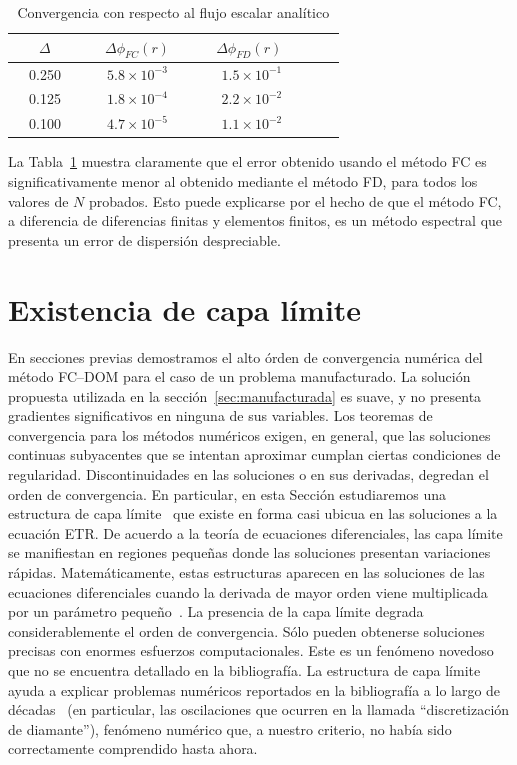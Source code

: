 \begin{table}[h!]
\caption{Convergencia con respecto al flujo escalar analítico} 
\vspace{-0.3cm}
\begin{center}
\begin{tabular}{ccccc}
\hline
  ~~$\Delta$~~  &  ~~$\Delta \phi_{FC}(r)$~~   &   ~~$\Delta \phi_{FD}(r)$ ~~ \\
\hline
 ~~0.250~~   &  ~~$5.8\times 10^{-3}$~~  &  ~~$1.5\times 10^{-1}$~~   \\
 ~~0.125~~   &  ~~$1.8\times 10^{-4}$~~  &  ~~$2.2\times 10^{-2}$~~   \\
 ~~0.100~~   &  ~~$4.7\times 10^{-5}$~~  &  ~~$1.1\times 10^{-2}$~~    \\
\hline
\end{tabular}
\label{tab:convFCanalytic}
\end{center}
\end{table}
La Tabla~\ref{tab:convFCanalytic} muestra claramente que el error obtenido 
usando el método FC es significativamente menor al obtenido mediante el método FD, 
para todos los valores de $N$ probados. 
Esto puede explicarse por el hecho de que el método FC, a diferencia de 
diferencias finitas y elementos finitos, es un método espectral que presenta un error 
de dispersión despreciable.

\section{Existencia de capa límite}
\label{sec:blayer}
En secciones previas demostramos el alto órden de convergencia numérica 
del método FC--DOM para el caso de un problema manufacturado.
La solución propuesta utilizada en la sección~\ref{sec:manufacturada}
es suave, y no presenta gradientes significativos en ninguna de sus variables. 
Los teoremas de convergencia para los métodos numéricos exigen, en general,  
que las soluciones continuas subyacentes que se intentan aproximar cumplan 
ciertas condiciones de regularidad. Discontinuidades en las soluciones 
o en sus derivadas, degredan el orden de convergencia.
En particular, en esta Sección estudiaremos 
una estructura de capa límite~\cite{Gaggioli2021} que existe en forma casi ubicua en las soluciones 
a la ecuación ETR. De acuerdo a la teoría de ecuaciones diferenciales, 
las capa límite se manifiestan en 
regiones  pequeñas donde las soluciones 
presentan variaciones rápidas. Matemáticamente, estas estructuras 
aparecen en las soluciones de las ecuaciones 
diferenciales cuando la derivada de mayor orden 
viene multiplicada por un parámetro 
pequeño~\cite[Cap. 9]{Bender1999}.
La presencia de la capa límite degrada considerablemente el orden de convergencia. 
Sólo pueden obtenerse soluciones precisas con enormes esfuerzos computacionales. 
 Este es un fenómeno novedoso que no 
se encuentra detallado en la bibliografía.  La estructura 
de capa límite ayuda a explicar problemas numéricos reportados en la bibliografía 
a lo largo de décadas~\cite{Case1967,Lewis1984,Petrovic1996,Bal2001,Hunter2015}  
(en particular, las oscilaciones que ocurren en la llamada 
``discretización de diamante''), fenómeno numérico que, a nuestro 
criterio, no había sido correctamente comprendido hasta ahora.


